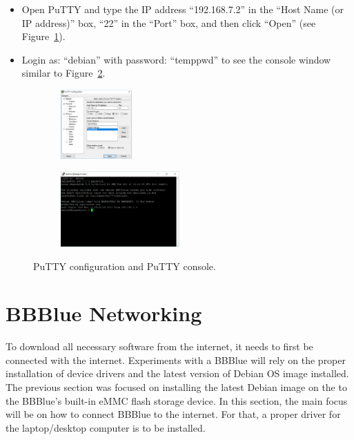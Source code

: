 \begin{mdframed}[frametitle=Testing OS with PuTTY, backgroundcolor=yellow!5, roundcorner=7pt,outerlinecolor= blue!70!black,outerlinewidth=1.2]
  \begin{itemize}
  \item Open PuTTY and type the IP address ``192.168.7.2'' in the ``Host Name (or IP address)'' box, ``22'' in the ``Port'' box, and then click ``Open''  (see Figure~\ref{fig:PuTTY-Configuration}). 
    
  \item Login as: ``debian'' with password: ``temppwd'' to see the console window similar to Figure~\ref{fig:PuTTY-Console}. 
  \end{itemize}
\end{mdframed}
%
\begin{figure}
  \centering
  \begin{subfigure}[b]{\linewidth}
    \centering
    \includegraphics[width=0.3\textwidth,height=0.22\textheight]{figs/img/Lab0/PuTTY}
    \caption{}
    \label{fig:PuTTY-Configuration}
  \end{subfigure}
  \begin{subfigure}[b]{\linewidth}
    \centering
    \includegraphics[width=0.5\textwidth,height=0.22\textheight]{figs/img/Lab0/PuTTY_Console}
    \caption{}
    \label{fig:PuTTY-Console}
  \end{subfigure}
  \caption{ PuTTY configuration and  PuTTY console.}
  \label{fig:PuTTY1}
\end{figure}
%

\section{BBBlue Networking}
\label{sec:usbConn}
To download all necessary software from the internet, it needs to first be
connected with the internet. Experiments with a BBBlue will rely on the proper
installation of device drivers and the latest version of Debian OS image
installed. The previous section was focused on installing the latest Debian
image on the to the BBBlue's built-in eMMC flash storage device. In this
section, the main focus will be on how to connect BBBlue to the internet. For
that, a proper driver for the laptop/desktop computer is to be installed. %

